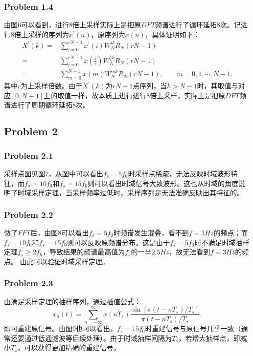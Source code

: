 \documentclass[a4paper,11pt,onecolumn,twoside]{article}
\begin{document}
\subsubsection{Problem 1.4}
由图6可以看到，进行8倍上采样实际上是把原$DFT$频谱进行了循环延拓8次。记进行8倍上采样的序列为$x^{'}(n)$，原序列为$x(n)$，具体证明如下：
\begin{equation}
\begin{split}
X^{'}(k) = & \sum_{i=0}^{rN-1} x^{'}(i)W_{N}^{ik}R_{N}(rN-1) \\
= & \sum_{i=0}^{rN-1}x(\frac{i}{r})W_{N}^{\frac{i}{r}k} R_{N}(rN-1) \\
= & \sum_{m=0}^{N-1} x(m)W_{N}^{mk}R_{N}(rN-1), \qquad m = 0,1,\cdots,N-1.
\end{split}
\end{equation}
其中$r$为上采样倍数。由于$X^{'}(k)$为$rN-1$点序列，当$k>N-1$时，其取值与对应$[0,N-1]$上的取值一样，故本质上进行进行8倍上采样，实际上是把原$DFT$频谱进行了周期循环延拓8次。

\subsection{Problem 2}

\subsubsection{Problem 2.1}
采样点图见图7，从图中可以看出$f_s=5f_0$时采样点稀疏，无法反映时域波形特征，而$f_s=10f_0$和$f_s=15f_0$则可以看出时域信号大致波形。这也从时域的角度说明了时域采样定理，当采样频率过低时，采样序列是无法准确反映出其特征的。

\subsubsection{Problem 2.2}
做了$FFT$后，由图8可以看出$f_s=5f_0$时频谱发生混叠，看不到$f=3Hz$的频点；而$f_s=10f_0$和$f_s=15f_0$则可以反映原频谱分布。这是由于$f_s=5f_0$时不满足时域抽样定理$f_s \geq 2f_h$，导致结果的频谱最高值为$f_s$的一半$2.5Hz$，故无法看到$f=3Hz$的频点。
由此可以验证时域采样定理。

\subsubsection{Problem 2.3}
由满足采样定理的抽样序列，通过插值公式：
\begin{equation}
x_a(t) =  \sum_{n = -\infty}^{\infty} x(nT_s) \frac{\sin[\pi (t-nT_s) / T_s]}{\pi (t-nT_s) / T_s}.
\end{equation}
即可重建原信号。由图9也可以看出，$f_s=15f_0$时重建信号与原信号几乎一致（通常还要通过低通滤波等后续处理）。由于时域抽样间隔为$T_s$，若增大抽样点，即减小$T_s$，可以获得更加精确的重建信号。
\end{document}
